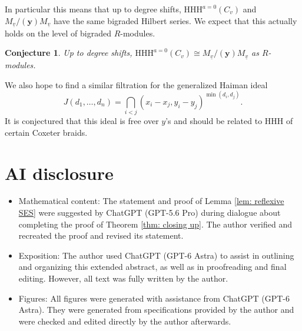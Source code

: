 \documentclass[submission]{FPSAC2027}
\newcommand{\uv}{\underline{v}}
\newcommand{\HHH}{\mathrm{HHH}}
\newtheorem{conj}[thm]{Conjecture}
\begin{document}
In particular this means that up to degree shifts, $\HHH^{a=0}(C_v)$ and $M_{\uv}/(\mathbf{y})M_{\uv}$ have the same bigraded Hilbert series. We expect that this actually holds on the level of bigraded $R$-modules.

\begin{conj}
    Up to degree shifts,
    $\HHH^{a=0}(C_v) \cong M_{\uv}/(\mathbf{y})M_{\uv}$
    as $R$-modules.
\end{conj}

We also hope to find a similar filtration for the generalized Haiman ideal
$$J(d_1, \dots, d_n) = \bigcap_{i<j} (x_i-x_j, y_i-y_j)^{\min(d_i,d_j)}.$$ It is conjectured that this ideal is free over $y$'s and should be related to $\HHH$ of certain Coxeter braids.


\nocite{*}
\printbibliography


\clearpage
\section*{AI disclosure}

\begin{itemize}
    \item Mathematical content: The statement and proof of Lemma \ref{lem: reflexive SES} were suggested by ChatGPT (GPT-5.6 Pro) during dialogue about completing the proof of Theorem \ref{thm: closing up}. The author verified and recreated the proof and revised its statement.
    \item Exposition: The author used ChatGPT (GPT-6 Astra) to assist in outlining and organizing this extended abstract, as well as in proofreading and final editing. However, all text was fully written by the author.
    \item Figures: All figures were generated with assistance from ChatGPT (GPT-6 Astra). They were generated from specifications provided by the author and were checked and edited directly by the author afterwards.
\end{itemize}
\end{document}

